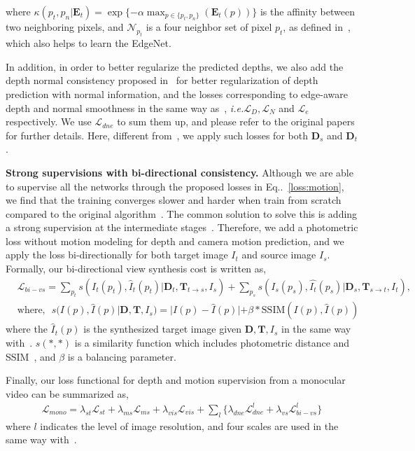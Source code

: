 \documentclass[runningheads]{llncs}
\makeatletter
\newcommand{\equref}[1]{Eq\onedot~\eqref{#1}}
\newcommand{\ve}[1]{{\mathbf #1}} \newcommand{\hua}[1]{{\mathcal #1}}
\newcommand{\scr}[1]{{\mathcal #1}}
\DeclareRobustCommand\onedot{\futurelet\@let@token\@onedot}
\def\onedot{\ifx\@let@token.\else.\null\fi\xspace}
\def\ie{\emph{i.e.}}
\makeatother
\begin{document}
where $\kappa(p_t, p_n|\ve{E}_t) = \exp\{-\alpha\max_{p\in\{p_t, p_n\}}(\ve{E}_t(p))\}$ is the affinity between two neighboring pixels, and $\hua{N}_{p_t}$ is a four neighbor set of pixel $p_t$, as defined in~\cite{yang2018cvpr}, which also helps to learn the EdgeNet.

In addition, in order to better regularize the predicted depths, we also add the depth normal consistency proposed in~\cite{yang2018aaai} for better regularization of depth prediction with normal information, and the losses corresponding to edge-aware depth and normal smoothness in the same way as~\cite{yang2018cvpr}, \ie $\hua{L}_D, \hua{L}_N$ and $\hua{L}_e$ respectively. We use $\scr{L}_{dne}$ to sum them up, and please refer to the original papers for further details. Here, different from~\cite{yang2018cvpr}, we apply such losses for both $\ve{D}_s$ and $\ve{D}_t$.

\noindent\textbf{Strong supervisions with bi-directional consistency.} Although we are able to supervise all the networks through the proposed losses in \equref{loss:motion}, we find that the training converges slower and harder when train from scratch compared to the original algorithm~\cite{yang2018cvpr}. The common solution to solve this is adding a strong supervision at the intermediate stages~\cite{simonyan2014very,lee2015deeply}. 
Therefore, we add a photometric loss without motion modeling for depth and camera motion prediction, and we apply the loss bi-directionally for both target image $I_t$ and source image $I_s$. Formally, our bi-directional view synthesis cost is written as,
\begin{align}
&\scr{L}_{bi-vs}\! =\! \sum\nolimits_{p_t}\!s(I_t(p_t), \hat{I}_t(p_t) | \ve{D}_t, \ve{T}_{t\rightarrow s}, I_s) + \sum\nolimits_{p_s}\!s(I_s(p_s), \hat{I_t}(p_s)| \ve{D}_s, \ve{T}_{s\rightarrow t}, I_t),  \nonumber \\
&\mbox{where,~~} s(I(p), \hat{I}(p) | \ve{D}, \ve{T}, I_s) = |I(p) - \hat{I}(p)| + \beta * \mbox{SSIM}(I(p), \hat{I}(p))
\label{eqn:bidirectional}
\end{align}
where the $\hat{I}_t(p)$ is the synthesized target image given $\ve{D}, \ve{T}, I_s$ in the same way with~\cite{zhou2017unsupervised}. $s(*, *)$ is a similarity function which includes photometric distance and SSIM~\cite{wang2004image}, and $\beta$ is a balancing parameter.

Finally, our loss functional for depth and motion supervision from a monocular video can be summarized as,
\begin{align}
\scr{L}_{mono}\! =\! \lambda_{st}\scr{L}_{st} + \lambda_{ms}\scr{L}_{ms} + \lambda_{vis}\scr{L}_{vis} + \sum\nolimits_l\{\lambda_{dne}\scr{L}_{dne}^l + \lambda_{vs}\scr{L}_{bi-vs}^l\}
\end{align}
where $l$ indicates the level of image resolution, and four scales are used in the same way with~\cite{zhou2017unsupervised}.
\end{document}
